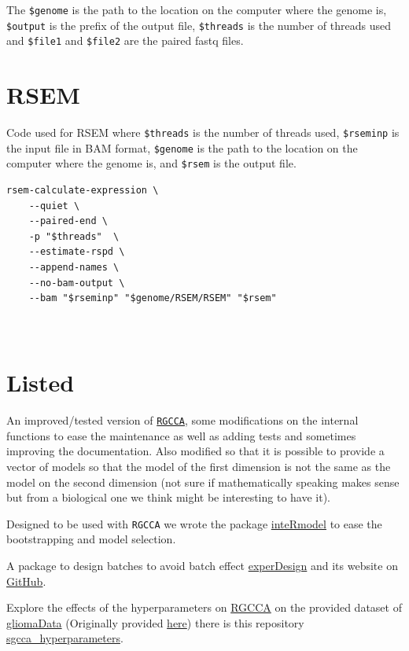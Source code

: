 \documentclass[
  12pt,
  a4paper,
  twoside,
  openright]{book}
\begin{document}
The \texttt{\$genome} is the path to the location on the computer where the genome is, \texttt{\$output} is the prefix of the output file, \texttt{\$threads} is the number of threads used and \texttt{\$file1} and \texttt{\$file2} are the paired fastq files.

\hypertarget{rsem}{%
\section{RSEM}\label{rsem}}

Code used for RSEM where \texttt{\$threads} is the number of threads used, \texttt{\$rseminp} is the input file in BAM format, \texttt{\$genome} is the path to the location on the computer where the genome is, and \texttt{\$rsem} is the output file.

\begin{verbatim}
rsem-calculate-expression \
    --quiet \
    --paired-end \
    -p "$threads"  \
    --estimate-rspd \
    --append-names \
    --no-bam-output \
    --bam "$rseminp" "$genome/RSEM/RSEM" "$rsem"
    
    
\end{verbatim}

\hypertarget{listed}{%
\section{Listed}\label{listed}}

An improved/tested version of \href{https://github.com/llrs/RGCCA}{\texttt{RGCCA}}, some modifications on the internal functions to ease the maintenance as well as adding tests and sometimes improving the documentation.
Also modified so that it is possible to provide a vector of models so that the model of the first dimension is not the same as the model on the second dimension (not sure if mathematically speaking makes sense but from a biological one we think might be interesting to have it).

Designed to be used with \texttt{RGCCA} we wrote the package \href{https:github.com/llrs/inteRmodel}{inteRmodel} to ease the bootstrapping and model selection.

A package to design batches to avoid batch effect \href{https://cran.r-project.org/package=experDesign}{experDesign} and its website on \href{https://github.com/llrs/experDesign}{GitHub}.

Explore the effects of the hyperparameters on \protect\hyperlink{acronyms_RGCCA}{RGCCA} on the provided dataset of \href{https://github.com/llrs/gliomaData}{gliomaData} (Originally provided \href{http://biodev.cea.fr/sgcca/}{here}) there is this repository \href{https://github.com/llrs/sgcca_hyperparameters}{sgcca\_hyperparameters}.
\end{document}
